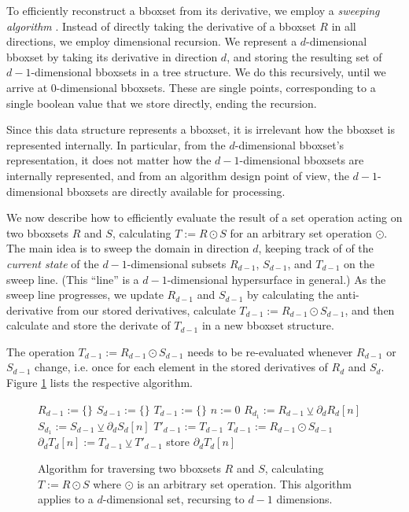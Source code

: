 \documentclass[conference]{IEEEtran}
\begin{document}
To efficiently reconstruct a bboxset from its derivative, we employ a
\emph{sweeping algorithm} \cite{wiki:sweeping}.
Instead of
directly taking the derivative of a bboxset $R$ in all directions, we
employ dimensional recursion. We represent a $d$-dimensional bboxset
by taking its derivative in direction $d$, and storing the resulting
set of $d-1$-dimensional bboxsets in a tree structure. We do this
recursively, until we arrive at $0$-dimensional bboxsets. These are
single points, corresponding to a single boolean value that we store
directly, ending the recursion.

Since this data structure represents a bboxset, it is irrelevant how
the bboxset is represented internally. In particular, from the
$d$-dimensional bboxset's representation, it does not matter how the
$d-1$-dimensional bboxsets are internally represented, and from an
algorithm design point of view, the $d-1$-dimensional bboxsets are
directly available for processing.

We now describe how to efficiently evaluate the result of a set
operation acting on two bboxsets $R$ and $S$, calculating $T := R
\odot S$ for an arbitrary set operation $\odot$.
The main idea is to sweep the domain in direction $d$,
keeping track of of the \emph{current state} of the $d-1$-dimensional
subsets $R_{d-1}$, $S_{d-1}$, and $T_{d-1}$ on the sweep line.
(This ``line'' is a $d-1$-dimensional hypersurface in general.)
As the sweep line progresses, we update $R_{d-1}$ and $S_{d-1}$ by
calculating the anti-derivative from our stored derivatives, calculate
$T_{d-1} := R_{d-1} \odot S_{d-1}$, and then calculate and store the
derivate of $T_{d-1}$ in a new bboxset structure.

The operation $T_{d-1} := R_{d-1} \odot S_{d-1}$ needs to be
re-evaluated whenever $R_{d-1}$ or $S_{d-1}$ change, i.e. once for
each element in the stored derivatives of $R_d$ and $S_d$.
Figure \ref{fig:bboxset-traverse} lists the respective algorithm.



\begin{figure}
  \begin{algorithmic}
    \STMT $R_{d-1} := \{\}$
    \STMT $S_{d-1} := \{\}$
    \STMT $T_{d-1} := \{\}$
    \STMT $n := 0$
    \STMT $R_{d_1} := R_{d-1} \veebar \partial_dR_d[n]$
    \ENDIF
    \STMT $S_{d_1} := S_{d-1} \veebar \partial_dS_d[n]$
    \ENDIF
    \STMT $T'_{d-1} := T_{d-1}$
    \STMT $T_{d-1} := R_{d-1} \odot S_{d-1}$
    \STMT $\partial_dT_d[n] := T_{d-1} \veebar T'_{d-1}$
    \STMT store $\partial_dT_d[n]$
    \ENDIF
    \ENDWHILE
  \end{algorithmic}
  \caption{Algorithm for traversing two bboxsets $R$ and $S$,
    calculating $T := R \odot S$ where $\odot$ is an arbitrary set
    operation. This algorithm applies to a
    $d$-dimensional set, recursing to $d-1$ dimensions.}
  \label{fig:bboxset-traverse}
\end{figure}
\end{document}
